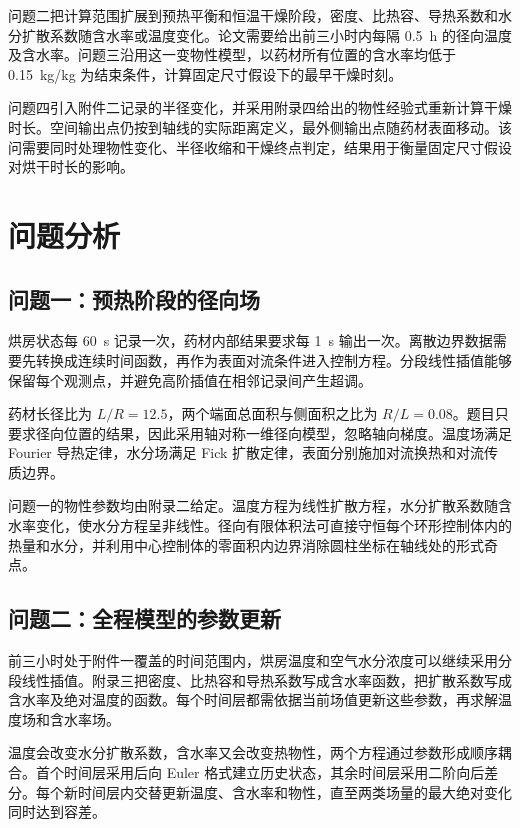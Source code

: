 \documentclass[withoutpreface,bwprint]{cumcmthesis}
\begin{document}
问题二把计算范围扩展到预热平衡和恒温干燥阶段，密度、比热容、导热系数和水分扩散系数随含水率或温度变化。论文需要给出前三小时内每隔 \SI{0.5}{h} 的径向温度及含水率。问题三沿用这一变物性模型，以药材所有位置的含水率均低于 \SI{0.15}{kg/kg} 为结束条件，计算固定尺寸假设下的最早干燥时刻。

问题四引入附件二记录的半径变化，并采用附录四给出的物性经验式重新计算干燥时长。空间输出点仍按到轴线的实际距离定义，最外侧输出点随药材表面移动。该问需要同时处理物性变化、半径收缩和干燥终点判定，结果用于衡量固定尺寸假设对烘干时长的影响。

\section{问题分析}

\subsection{问题一：预热阶段的径向场}

烘房状态每 \SI{60}{s} 记录一次，药材内部结果要求每 \SI{1}{s} 输出一次。离散边界数据需要先转换成连续时间函数，再作为表面对流条件进入控制方程。分段线性插值能够保留每个观测点，并避免高阶插值在相邻记录间产生超调。

药材长径比为 \(L/R=12.5\)，两个端面总面积与侧面积之比为 \(R/L=0.08\)。题目只要求径向位置的结果，因此采用轴对称一维径向模型，忽略轴向梯度。温度场满足 Fourier 导热定律，水分场满足 Fick 扩散定律，表面分别施加对流换热和对流传质边界。

问题一的物性参数均由附录二给定。温度方程为线性扩散方程，水分扩散系数随含水率变化，使水分方程呈非线性。径向有限体积法可直接守恒每个环形控制体内的热量和水分，并利用中心控制体的零面积内边界消除圆柱坐标在轴线处的形式奇点。

\subsection{问题二：全程模型的参数更新}

前三小时处于附件一覆盖的时间范围内，烘房温度和空气水分浓度可以继续采用分段线性插值。附录三把密度、比热容和导热系数写成含水率函数，把扩散系数写成含水率及绝对温度的函数。每个时间层都需依据当前场值更新这些参数，再求解温度场和含水率场。

温度会改变水分扩散系数，含水率又会改变热物性，两个方程通过参数形成顺序耦合。首个时间层采用后向 Euler 格式建立历史状态，其余时间层采用二阶向后差分。每个新时间层内交替更新温度、含水率和物性，直至两类场量的最大绝对变化同时达到容差。
\end{document}
